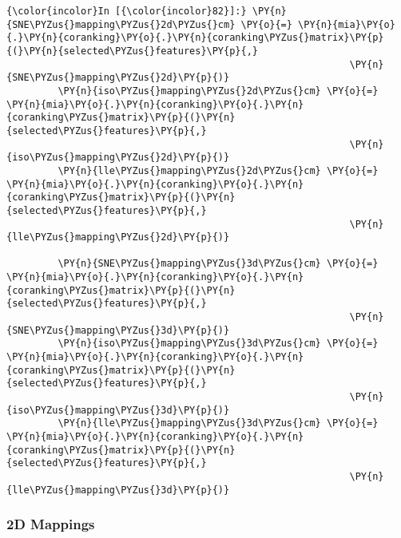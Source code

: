     \begin{Verbatim}[commandchars=\\\{\}]
{\color{incolor}In [{\color{incolor}82}]:} \PY{n}{SNE\PYZus{}mapping\PYZus{}2d\PYZus{}cm} \PY{o}{=} \PY{n}{mia}\PY{o}{.}\PY{n}{coranking}\PY{o}{.}\PY{n}{coranking\PYZus{}matrix}\PY{p}{(}\PY{n}{selected\PYZus{}features}\PY{p}{,}
                                                            \PY{n}{SNE\PYZus{}mapping\PYZus{}2d}\PY{p}{)}
         \PY{n}{iso\PYZus{}mapping\PYZus{}2d\PYZus{}cm} \PY{o}{=} \PY{n}{mia}\PY{o}{.}\PY{n}{coranking}\PY{o}{.}\PY{n}{coranking\PYZus{}matrix}\PY{p}{(}\PY{n}{selected\PYZus{}features}\PY{p}{,}
                                                            \PY{n}{iso\PYZus{}mapping\PYZus{}2d}\PY{p}{)}
         \PY{n}{lle\PYZus{}mapping\PYZus{}2d\PYZus{}cm} \PY{o}{=} \PY{n}{mia}\PY{o}{.}\PY{n}{coranking}\PY{o}{.}\PY{n}{coranking\PYZus{}matrix}\PY{p}{(}\PY{n}{selected\PYZus{}features}\PY{p}{,}
                                                            \PY{n}{lle\PYZus{}mapping\PYZus{}2d}\PY{p}{)}

         \PY{n}{SNE\PYZus{}mapping\PYZus{}3d\PYZus{}cm} \PY{o}{=} \PY{n}{mia}\PY{o}{.}\PY{n}{coranking}\PY{o}{.}\PY{n}{coranking\PYZus{}matrix}\PY{p}{(}\PY{n}{selected\PYZus{}features}\PY{p}{,}
                                                            \PY{n}{SNE\PYZus{}mapping\PYZus{}3d}\PY{p}{)}
         \PY{n}{iso\PYZus{}mapping\PYZus{}3d\PYZus{}cm} \PY{o}{=} \PY{n}{mia}\PY{o}{.}\PY{n}{coranking}\PY{o}{.}\PY{n}{coranking\PYZus{}matrix}\PY{p}{(}\PY{n}{selected\PYZus{}features}\PY{p}{,}
                                                            \PY{n}{iso\PYZus{}mapping\PYZus{}3d}\PY{p}{)}
         \PY{n}{lle\PYZus{}mapping\PYZus{}3d\PYZus{}cm} \PY{o}{=} \PY{n}{mia}\PY{o}{.}\PY{n}{coranking}\PY{o}{.}\PY{n}{coranking\PYZus{}matrix}\PY{p}{(}\PY{n}{selected\PYZus{}features}\PY{p}{,}
                                                            \PY{n}{lle\PYZus{}mapping\PYZus{}3d}\PY{p}{)}
\end{Verbatim}

    \subsubsection{2D Mappings}\label{d-mappings}

